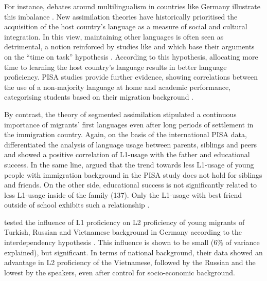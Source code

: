 \documentclass[output=paper,colorlinks,citecolor=brown]{langscibook}
\begin{document}
For instance, debates around multilingualism in countries like Germany illustrate this imbalance \citep{gogolin_neumann}. New assimilation theories \citep{alba_nee2003,alba_nee1997} have historically prioritised the acquisition of the host country's language as a measure of social and cultural integration. In this view, maintaining other languages is often seen as detrimental, a notion reinforced by studies like \citet{esser2006} and \citet{hopf2005} which base their arguments on the ``time on task'' hypothesis \citep{Carroll1963ModelSchoolLearning}. According to this hypothesis, allocating more time to learning the host country's language results in better language proficiency. PISA studies provide further evidence, showing correlations between the use of a non-majority language at home and academic performance, categorising students based on their migration background \citep{mullis_martin_foy_hooper2017}.

By contrast, the theory of segmented assimilation \citep{portes_rumbaut2001} stipulated a continuous importance of migrants' first languages even after long periods of settlement in the immigration country. Again, on the basis of the international PISA data, \citet{agirdag_vanlaar2016} differentiated the analysis of language usage between parents, siblings and peers and showed a positive correlation of L1-usage with the father and educational success. In the same line, \citet{rauch2019} argued that the trend towards less L1-usage of young people with immigration background in the PISA study does not hold for siblings and friends. On the other side, educational success is not significantly related to less L1-usage inside of the family (137). Only the L1-usage with best friend outside of school exhibits such a relationship \citep{rauch2019}.

\citet{knigge_klinger_schnoor_gogolin2015} tested the influence of L1 proficiency on L2 proficiency of young migrants of Turkish, Russian and Vietnamese background in Germany according to the interdependency hypothesis \citep{cummins1979}. This influence is shown to be small (6\% of variance explained), but significant. In terms of national background, their data showed an advantage in L2 proficiency of the Vietnamese, followed by the Russian and the lowest by the  speakers, even after control for socio-economic background.
\end{document}
